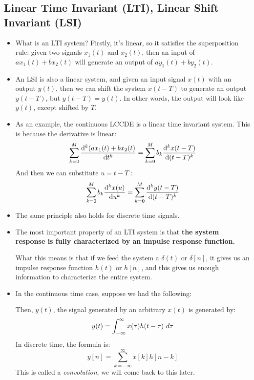 \subsection{Linear Time Invariant (LTI), Linear Shift Invariant (LSI)}
\begin{itemize}
	\item What is an LTI system? Firstly, it's linear, so it satisfies the superposition rule: given 
		two signals \( x_1(t) \) and \( x_2(t) \), then an input of \( ax_1(t) + bx_2(t) \) will generate 
		an output of \( ay_1(t) + by_2(t) \). 
	\item An LSI is also a linear system, and given an input signal \( x(t) \) with an output 
		\( y(t) \), then we can shift
		the system \( x(t - T) \) to generate an output \( y(t - T) \), but \( y(t - T) = y(t) \). In other words, 
		the output will look like \( y(t) \), except shifted by \( T \).  
	\item As an example, the continuous LCCDE is a linear time invariant system. This is because the derivative 
		is linear: 
		\[
			\sum_{k = 0}^{M}\dv[k]{(ax_1(t) + bx_2(t)}{t} = \sum_{k = 0}^{M}b_k \dv[k]{x(t - T)}{(t - T)}
		\] 
		And then we can substitute \( u = t - T \) :
		\[
			\sum_{k = 0}^{M}b_k \dv[k]{x(u)}{u} = \sum_{k = 0}^{M}\dv[k]{y(t - T)}{(t - T)}
		\] 
	\item The same principle also holds for discrete time signals. 
	\item The most important property of an LTI system is that \textbf{the system response is fully characterized 
		by an impulse response function.}

		What this means is that if we feed the system a \( \delta(t) \) or \( \delta[n] \), it gives us an 
		impulse response function \( h(t) \) or \( h[n] \), and this gives us enough information to characterize
		the entire system.
	\item In the continuous time case, suppose we had the following:
		\begin{center}
		\end{center}
		Then, \( y(t) \), the signal generated by an arbitrary \( x(t) \) is generated by:
		\[
		y(t) = \int_{-\infty}^{\infty} x(\tau) h(t - \tau) \ d \tau 
		\] 
		In discrete time, the formula is: 
		\[
			y[n] = \sum_{k= -\infty}^{\infty} x[k] h[n - k]
		\] 
		This is called a \textit{convolution}, we will come back to this later. 
\end{itemize}
